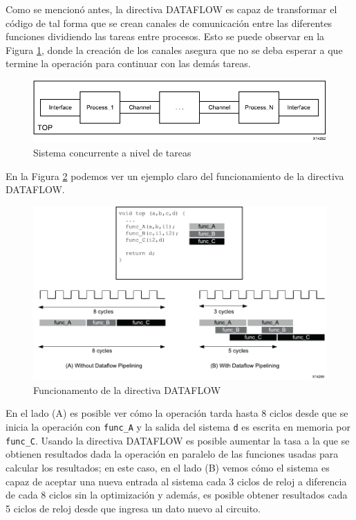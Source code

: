 Como se mencionó antes, la directiva DATAFLOW es capaz de transformar el código de tal forma que se crean canales de comunicación entre las diferentes funciones dividiendo las tareas entre procesos. Esto se puede observar en la Figura \ref{fig:HLS15}, donde la creación de los canales asegura que no se deba esperar a que termine la operación para continuar con las demás tareas.

\begin{figure}[H]
  \centering
    \includegraphics[scale=0.8]{./Figures/HLS15.pdf}
  \caption{Sistema concurrente a nivel de tareas \citep{HLS2015}}
  \label{fig:HLS15}
\end{figure}

En la Figura \ref{fig:HLS16} podemos ver un ejemplo claro del funcionamiento de la directiva DATAFLOW.

\begin{figure}[H]
  \centering
    \includegraphics[scale=0.8]{./Figures/HLS16.pdf}
  \caption{Funcionamento de la directiva DATAFLOW \citep{HLS2015}}
  \label{fig:HLS16}
\end{figure}

En el lado (A) es posible ver cómo la operación tarda hasta 8 ciclos desde que se inicia la operación con \texttt{func\_A} y la salida del sistema \texttt{d} es escrita en memoria por \texttt{func\_C}. Usando la directiva DATAFLOW es posible aumentar la tasa a la que se obtienen resultados dada la operación en paralelo de las funciones usadas para calcular los resultados; en este caso, en el lado (B) vemos cómo el sistema es capaz de aceptar una nueva entrada al sistema cada 3 ciclos de reloj a diferencia de cada 8 ciclos sin la optimización y además, es posible obtener resultados cada 5 ciclos de reloj desde que ingresa un dato nuevo al circuito.

